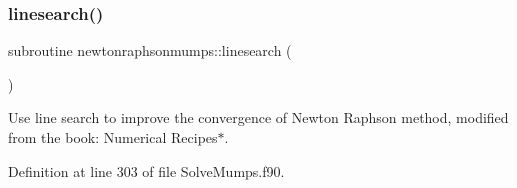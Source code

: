 \subsubsection{\texorpdfstring{linesearch()}{linesearch()}}
{\footnotesize\ttfamily subroutine newtonraphsonmumps\+::linesearch (\begin{DoxyParamCaption}{ }\end{DoxyParamCaption})\hspace{0.3cm}{\ttfamily [private]}}



Use line search to improve the convergence of Newton Raphson method, modified from the book\+: Numerical Recipes$\ast$. 



Definition at line 303 of file Solve\+Mumps.\+f90.


